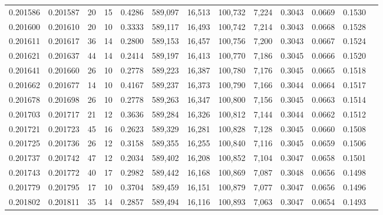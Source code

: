 \begin{tabular}{rrrrrrrrrrrrr}
0.201586 & 0.201587 &    20 &  15 &                                     0.4286 & 589,097 &  16,513 & 100,732 &   7,224 & 0.3043 & 0.0669 & 0.1530 \\
0.201600 & 0.201610 &    20 &  10 &                                     0.3333 & 589,117 &  16,493 & 100,742 &   7,214 & 0.3043 & 0.0668 & 0.1528 \\
0.201611 & 0.201617 &    36 &  14 &                                     0.2800 & 589,153 &  16,457 & 100,756 &   7,200 & 0.3043 & 0.0667 & 0.1524 \\
0.201621 & 0.201637 &    44 &  14 &                                     0.2414 & 589,197 &  16,413 & 100,770 &   7,186 & 0.3045 & 0.0666 & 0.1520 \\
0.201641 & 0.201660 &    26 &  10 &                                     0.2778 & 589,223 &  16,387 & 100,780 &   7,176 & 0.3045 & 0.0665 & 0.1518 \\
0.201662 & 0.201677 &    14 &  10 &                                     0.4167 & 589,237 &  16,373 & 100,790 &   7,166 & 0.3044 & 0.0664 & 0.1517 \\
0.201678 & 0.201698 &    26 &  10 &                                     0.2778 & 589,263 &  16,347 & 100,800 &   7,156 & 0.3045 & 0.0663 & 0.1514 \\
0.201703 & 0.201717 &    21 &  12 &                                     0.3636 & 589,284 &  16,326 & 100,812 &   7,144 & 0.3044 & 0.0662 & 0.1512 \\
0.201721 & 0.201723 &    45 &  16 &                                     0.2623 & 589,329 &  16,281 & 100,828 &   7,128 & 0.3045 & 0.0660 & 0.1508 \\
0.201725 & 0.201736 &    26 &  12 &                                     0.3158 & 589,355 &  16,255 & 100,840 &   7,116 & 0.3045 & 0.0659 & 0.1506 \\
0.201737 & 0.201742 &    47 &  12 &                                     0.2034 & 589,402 &  16,208 & 100,852 &   7,104 & 0.3047 & 0.0658 & 0.1501 \\
0.201743 & 0.201772 &    40 &  17 &                                     0.2982 & 589,442 &  16,168 & 100,869 &   7,087 & 0.3048 & 0.0656 & 0.1498 \\
0.201779 & 0.201795 &    17 &  10 &                                     0.3704 & 589,459 &  16,151 & 100,879 &   7,077 & 0.3047 & 0.0656 & 0.1496 \\
0.201802 & 0.201811 &    35 &  14 &                                     0.2857 & 589,494 &  16,116 & 100,893 &   7,063 & 0.3047 & 0.0654 & 0.1493 \\

\end{tabular}
